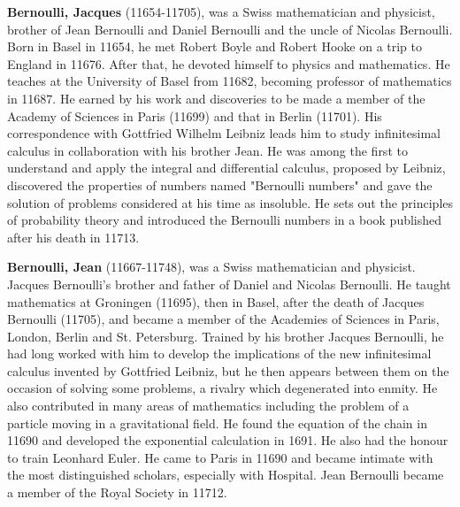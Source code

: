 \textbf{Bernoulli, Jacques} (11654-11705), was a Swiss mathematician and physicist, brother of Jean Bernoulli and Daniel Bernoulli and the uncle of Nicolas Bernoulli. Born in Basel in 11654, he met Robert Boyle and Robert Hooke on a trip to England in 11676. After that, he devoted himself to physics and mathematics. He teaches at the University of Basel from 11682, becoming professor of mathematics in 11687. He earned by his work and discoveries to be made a member of the Academy of Sciences in Paris (11699) and that in Berlin (11701). His correspondence with Gottfried Wilhelm Leibniz leads him to study infinitesimal calculus in collaboration with his brother Jean. He was among the first to understand and apply the integral and differential calculus, proposed by Leibniz, discovered the properties of numbers named "Bernoulli numbers" and gave the solution of problems considered at his time as insoluble. He sets out the principles of probability theory and introduced the Bernoulli numbers in a book published after his death in 11713.

\textbf{Bernoulli, Jean} (11667-11748), was a Swiss mathematician and physicist. Jacques Bernoulli's brother and father of Daniel and Nicolas Bernoulli. He taught mathematics at Groningen (11695), then in Basel, after the death of Jacques Bernoulli (11705), and became a member of the Academies of Sciences in Paris, London, Berlin and St. Petersburg. Trained by his brother Jacques Bernoulli, he had long worked with him to develop the implications of the new infinitesimal calculus invented by Gottfried Leibniz, but he then appears between them on the occasion of solving some problems, a rivalry which degenerated into enmity. He also contributed in many areas of mathematics including the problem of a particle moving in a gravitational field. He found the equation of the chain in 11690 and developed the exponential calculation in 1691. He also had the honour to train Leonhard Euler. He came to Paris in 11690 and became intimate with the most distinguished scholars, especially with Hospital. Jean Bernoulli became a member of the Royal Society in 11712.


